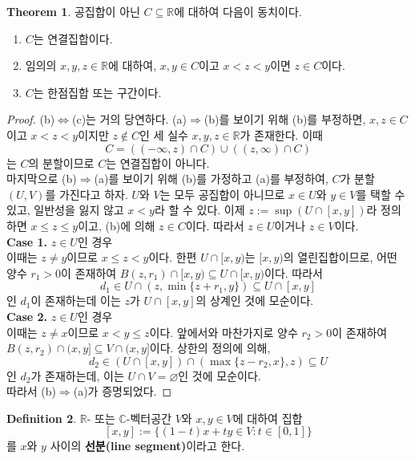 \documentclass[11pt]{book}
\numberwithin{equation}{chapter}
\def\RR{\mathbb{R}}
\def\CC{\mathbb{C}}
\theoremstyle{definition}
\newtheorem{thm}{Theorem}[section]
\newtheorem{defn}[thm]{Definition}
\newenvironment{enum}
	{\begin{enumerate}[label=(\alph*), leftmargin=2\parindent]}
	{\end{enumerate}}
\begin{document}
\begin{thm} \label{thm 6.5.1}
    공집합이 아닌 \(C \subseteq \RR\)에 대하여 다음이 동치이다.
    \begin{enum}
        \item \(C\)는 연결집합이다.
        \item 임의의 \(x, y, z \in \RR\)에 대하여, \(x, y \in C\)이고 \(x < z < y\)이면 \(z \in C\)이다.
        \item \(C\)는 한점집합 또는 구간이다.
    \end{enum}
\end{thm}
\begin{proof}
    (b)\(\Leftrightarrow\)(c)는 거의 당연하다. (a)\(\Rightarrow\)(b)를 보이기 위해 (b)를 부정하면, \(x, z \in C\)이고 \(x < z < y\)이지만 \(z \notin C\)인 세 실수 \(x, y, z \in \RR\)가 존재한다. 이때
    \[
    C = ((-\infty, z) \cap C) \cup ((z, \infty) \cap C)    
    \]
    는 \(C\)의 분할이므로 \(C\)는 연결집합이 아니다.\\
    마지막으로 (b)\(\Rightarrow\)(a)를 보이기 위해 (b)를 가정하고 (a)를 부정하여, \(C\)가 분할 \((U, V)\)를 가진다고 하자. \(U\)와 \(V\)는 모두 공집합이 아니므로 \(x \in U\)와 \(y \in V\)를 택할 수 있고, 일반성을 잃지 않고 \(x < y\)라 할 수 있다. 이제 \(z := \sup (U \cap [x, y])\)라 정의하면 \(x \le z \le y\)이고, (b)에 의해 \(z \in C\)이다. 따라서 \(z \in U\)이거나 \(z \in V\)이다.\\
    \textbf{Case 1.} \(z \in U\)인 경우\\
    이때는 \(z \ne y\)이므로 \(x \le z < y\)이다. 한편 \(U \cap [x, y)\)는 \([x, y)\)의 열린집합이므로, 어떤 양수 \(r_1 > 0\)이 존재하여 \(B(z, r_1) \cap [x, y) \subseteq U \cap [x, y)\)이다. 따라서
    \[
    d_1 \in U \cap (z, \min\{z + r_1, y\}) \subseteq U \cap [x, y]  
    \]
    인 \(d_1\)이 존재하는데 이는 \(z\)가 \(U \cap [x, y]\)의 상계인 것에 모순이다.\\
    \textbf{Case 2.} \(z \in U\)인 경우\\
    이때는 \(z \ne x\)이므로 \(x < y \le z\)이다. 앞에서와 마찬가지로 양수 \(r_2 > 0\)이 존재하여 \(B(z, r_2) \cap (x, y] \subseteq V \cap (x, y] \)이다. 상한의 정의에 의해,
    \[
    d_2 \in (U \cap [x, y] ) \cap (\max\{z - r_2, x\}, z) \subseteq U
    \]
    인 \(d_2\)가 존재하는데, 이는 \(U \cap V = \varnothing\)인 것에 모순이다.\\
    따라서 (b)\(\Rightarrow\)(a)가 증명되었다.
\end{proof}

\begin{defn}
    \(\RR\)- 또는 \(\CC\)-벡터공간 \(V\)와 \(x, y \in V\)에 대하여 집합
    \[
    [x, y] := \{(1-t)x + ty \in V : t \in [0, 1]\}    
    \]
    를 \(x\)와 \(y\) 사이의 \textbf{선분(line segment)}이라고 한다.
\end{defn}
\end{document}

